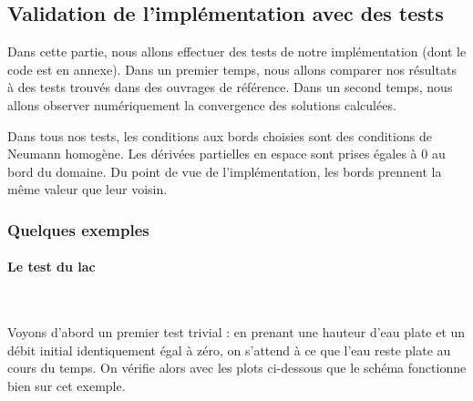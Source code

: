 \documentclass[
11pt, %
francais, %
singlespacing, %
headsepline, %
f%
]{MastersDoctoralThesis} %
\theoremstyle{definition}
\begin{document}
\subsection{Validation de l'implémentation avec des tests}

Dans cette partie, nous allons effectuer des tests de notre implémentation (dont le code est en annexe).
Dans un premier temps, nous allons comparer nos résultats à des tests trouvés dans des ouvrages de référence.
Dans un second temps, nous allons observer numériquement la convergence des solutions calculées.

Dans tous nos tests, les conditions aux bords choisies sont des conditions de Neumann homogène. Les dérivées partielles en espace sont prises égales à $0$ au bord du domaine.
Du point de vue de l'implémentation, les bords prennent la même valeur que leur voisin.

\subsubsection{Quelques exemples}

\paragraph{Le test du lac} \

Voyons d'abord un premier test trivial : en prenant une hauteur d'eau plate et un débit initial identiquement égal à zéro, on s'attend à ce que l'eau reste plate au cours du temps.
On vérifie 	alors avec les plots ci-dessous que le schéma fonctionne bien sur cet exemple.
\end{document}
